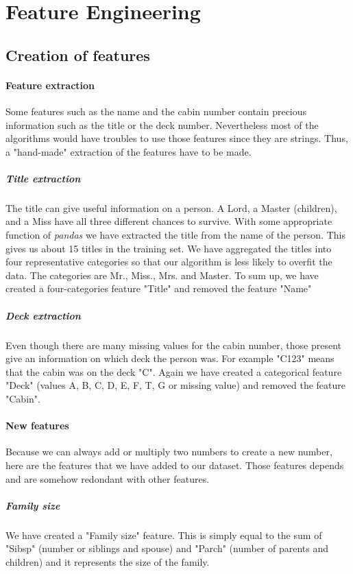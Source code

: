 \documentclass[11pt,a4paper,portrait]{article}
\begin{document}
\section{Feature Engineering}

\subsection{Creation of features}

\paragraph{Feature extraction}
Some features such as the name and the cabin number contain precious information such as the title or the deck number. Nevertheless most of the algorithms would have troubles to use those features since they are strings. Thus, a "hand-made" extraction of the features have to be made.

\subparagraph{Title extraction}
The title can give useful information on a person. A Lord, a Master (children), and a Miss have all three different chances to survive. With some appropriate function of \textit{pandas} we have extracted the title from the name of the person. This gives us about 15 titles in the training set. We have aggregated the titles into four representative categories so that our algorithm is less likely to overfit the data. The categories are Mr., Miss., Mrs. and Master. To sum up, we have created a four-categories feature "Title" and removed the feature "Name"


\subparagraph{Deck extraction}
Even though there are many missing values for the cabin number, those present give an information on which deck the person was. For example "C123" means that the cabin was on the deck "C". Again we have created a categorical feature "Deck" (values A, B, C, D, E, F, T, G or missing value) and removed the feature "Cabin".

\paragraph{New features}
Because we can always add or multiply two numbers to create a new number, here are the features that we have added to our dataset. Those features depends and are somehow redondant with other features.

\subparagraph{Family size}
We have created a "Family size" feature. This is simply equal to the sum of "Sibsp" (number or siblings and spouse) and "Parch" (number of parents and children) and it represents the size of the family.
\end{document}
